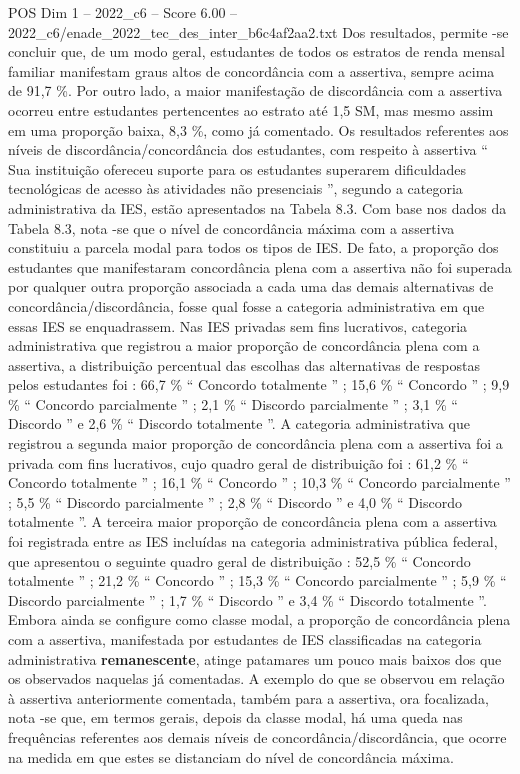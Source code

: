 \begin{textsample}{POS Dim 1 – 2022\_c6 – Score 6.00 – 2022\_c6/enade\_2022\_tec\_des\_inter\_b6c4af2aa2.txt}
Dos resultados, permite -se concluir que, de um modo geral, estudantes de todos os estratos de renda mensal familiar manifestam graus altos de concordância com a assertiva, sempre acima de 91,7 \%.
Por outro lado, a maior manifestação de discordância com a assertiva ocorreu entre estudantes pertencentes ao estrato até 1,5 SM, mas mesmo assim em uma proporção baixa, 8,3 \%, como já comentado.
Os resultados referentes aos níveis de discordância/concordância dos estudantes, com respeito à assertiva “ Sua instituição ofereceu suporte para os estudantes superarem dificuldades tecnológicas de acesso às atividades não presenciais ”, segundo a categoria administrativa da IES, estão apresentados na Tabela 8.3.
Com base nos dados da Tabela 8.3, nota -se que o nível de concordância máxima com a assertiva constituiu a parcela modal para todos os tipos de IES.
De fato, a proporção dos estudantes que manifestaram concordância plena com a assertiva não foi superada por qualquer outra proporção associada a cada uma das demais alternativas de concordância/discordância, fosse qual fosse a categoria administrativa em que essas IES se enquadrassem.
Nas IES privadas sem fins lucrativos, categoria administrativa que registrou a maior proporção de concordância plena com a assertiva, a distribuição percentual das escolhas das alternativas de respostas pelos estudantes foi : 66,7 \% “ Concordo totalmente ” ; 15,6 \% “ Concordo ” ; 9,9 \% “ Concordo parcialmente ” ; 2,1 \% “ Discordo parcialmente ” ; 3,1 \% “ Discordo ” e 2,6 \% “ Discordo totalmente ”.
A categoria administrativa que registrou a segunda maior proporção de concordância plena com a assertiva foi a privada com fins lucrativos, cujo quadro geral de distribuição foi : 61,2 \% “ Concordo totalmente ” ; 16,1 \% “ Concordo ” ; 10,3 \% “ Concordo parcialmente ” ; 5,5 \% “ Discordo parcialmente ” ; 2,8 \% “ Discordo ” e 4,0 \% “ Discordo totalmente ”.
A terceira maior proporção de concordância plena com a assertiva foi registrada entre as IES incluídas na categoria administrativa pública federal, que apresentou o seguinte quadro geral de distribuição : 52,5 \% “ Concordo totalmente ” ; 21,2 \% “ Concordo ” ; 15,3 \% “ Concordo parcialmente ” ; 5,9 \% “ Discordo parcialmente ” ; 1,7 \% “ Discordo ” e 3,4 \% “ Discordo totalmente ”.
Embora ainda se configure como classe modal, a proporção de concordância plena com a assertiva, manifestada por estudantes de IES classificadas na categoria administrativa \textbf{remanescente}, atinge patamares um pouco mais baixos dos que os observados naquelas já comentadas.
A exemplo do que se observou em relação à assertiva anteriormente comentada, também para a assertiva, ora focalizada, nota -se que, em termos gerais, depois da classe modal, há uma queda nas frequências referentes aos demais níveis de concordância/discordância, que ocorre na medida em que estes se distanciam do nível de concordância máxima.

\end{textsample}
